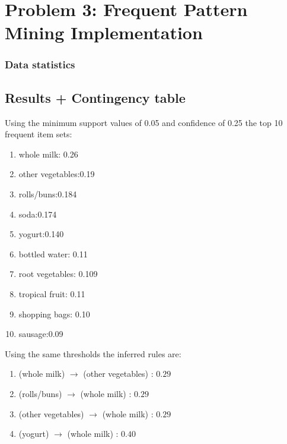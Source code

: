 \documentclass[11pt]{article}
\begin{document}
\section{Problem 3: Frequent Pattern Mining Implementation}
\subsubsection{Data statistics}
\begin{table}[h]
    \centering
    \caption{Grocery dataset statistics}
    \label{tab:stats}
\end{table}
\subsection{Results + Contingency table}
Using the minimum support values of 0.05 and confidence of 0.25 the top 10 frequent item sets:
\begin{enumerate}
    \item whole milk: 0.26
    \item other vegetables:0.19
    \item rolls/buns:0.184
    \item soda:0.174
    \item yogurt:0.140
    \item bottled water: 0.11
    \item root vegetables: 0.109
    \item tropical fruit: 0.11
    \item shopping bags: 0.10
    \item sausage:0.09
\end{enumerate}
Using the same thresholds the inferred rules are:
\begin{enumerate}
    \item (whole milk) $\rightarrow$ (other vegetables) : $0.29$
    \item (rolls/buns) $\rightarrow$ (whole milk) : $0.29$
    \item (other vegetables) $\rightarrow$ (whole milk) : $0.29$
    \item (yogurt) $\rightarrow$ (whole milk) : $0.40$
\end{enumerate}
\end{document}
